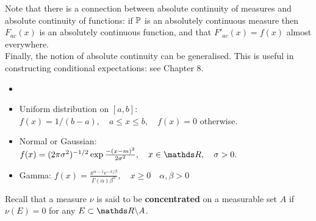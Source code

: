 Note that there is a connection between absolute continuity of measures and absolute continuity of functions: if $\mathbb{P}$ is an absolutely continuous measure then $F_{ac}(x)$ is an absolutely continuous function, and that $F'_{ac}(x) = f(x)$ almost everywhere.\\

Finally, the notion of absolute continuity can be generalised. This is useful in constructing conditional expectations: see Chapter 8.

\begin{example}
\begin{itemize}
    \item[]
    \item Uniform distribution on $[a,b]$: $f(x) = 1/(b-a), \quad a\le x \le b, \quad f(x) = 0$ otherwise.
    \item Normal or Gaussian: $f(x) = (2\pi \sigma^2)^{-1/2}\exp{\frac{-(x-m)^2}{2\sigma^2}}, \quad x \in \R, \quad \sigma >0.$
    \item Gamma: $f(x) = \frac{x^{\alpha - 1}e^{-x/\beta}}{\Gamma(\alpha)\beta^\alpha}, \quad x \ge 0 \quad \alpha, \beta >0$
\end{itemize}
\end{example}
Recall that a measure $\nu$ is said to be \textbf{concentrated} on a measurable set $A$ if $\nu(E) = 0$ for any $E \subset \R\backslash A$.\\


